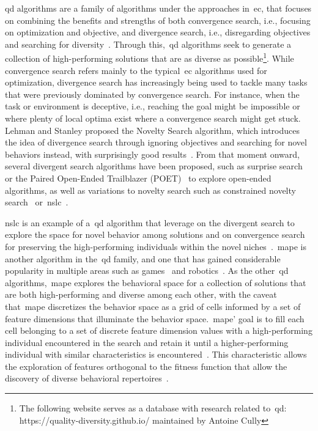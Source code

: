 \acrfull{qd} algorithms are a family of algorithms under the approaches in~\acrlong{ec}, that focuses on combining the benefits and strengths of both convergence search, i.e., focusing on optimization and objective, and divergence search, i.e., disregarding objectives and searching for diversity~\cite{pugh_quality_2016,gaier_are_2019}. Through this,~\acrshort{qd} algorithms seek to generate a collection of high-performing solutions that are as diverse as possible\footnote{The following website serves as a database with research related to~\acrshort{qd}: https://quality-diversity.github.io/ maintained by Antoine Cully}. While convergence search refers mainly to the typical~\acrshort{ec} algorithms used for optimization, divergence search has increasingly being used to tackle many tasks that were previously dominated by convergence search. For instance, when the task or environment is deceptive, i.e., reaching the goal might be impossible or where plenty of local optima exist where a convergence search might get stuck. Lehman and Stanley proposed the Novelty Search algorithm, which introduces the idea of divergence search through ignoring objectives and searching for novel behaviors instead, with surprisingly good results~\cite{lehman_abandoning_2011,lehman_revising_2010}. From that moment onward, several divergent search algorithms have been proposed, such as surprise search~\cite{gravina_surprise_2016} or the Paired Open-Ended Trailblazer (POET)~\cite{wang_poet_2019,wang_enhanced_2020,dharna_co-generation_2020} to explore open-ended algorithms, as well as variations to novelty search such as constrained novelty search~\cite{liapis_constrained_2015} or~\acrfull{nslc}~\cite{lehman_evolving_2011}.

\acrshort{nslc} is an example of a~\acrshort{qd} algorithm that leverage on the divergent search to explore the space for novel behavior among solutions and on convergence search for preserving the high-performing individuals within the novel niches~\cite{lehman_evolving_2011}.~\acrfull{mape} is another algorithm in the~\acrshort{qd} family, and one that has gained considerable popularity in multiple areas such as games~\cite{charity_mech-elites_2020,alvarez_empowering_2019,fontaine_mapping_2019} and robotics~\cite{cully_robots_2015,tjanaka_approximating_2022}. As the other~\acrshort{qd} algorithms,~\acrshort{mape} explores the behavioral space for a collection of solutions that are both high-performing and diverse among each other, with the caveat that~\acrshort{mape} discretizes the behavior space as a grid of cells informed by a set of feature dimensions that illuminate the behavior space.~\acrshort{mape}' goal is to fill each cell belonging to a set of discrete feature dimension values with a high-performing individual encountered in the search and retain it until a higher-performing individual with similar characteristics is encountered~\cite{mouret_illuminating_2015}. This characteristic allows the exploration of features orthogonal to the fitness function that allow the discovery of diverse behavioral repertoires~\cite{cully_autonomous_2019,justesen_learning_2020,grillotti_discovering_2022}.

